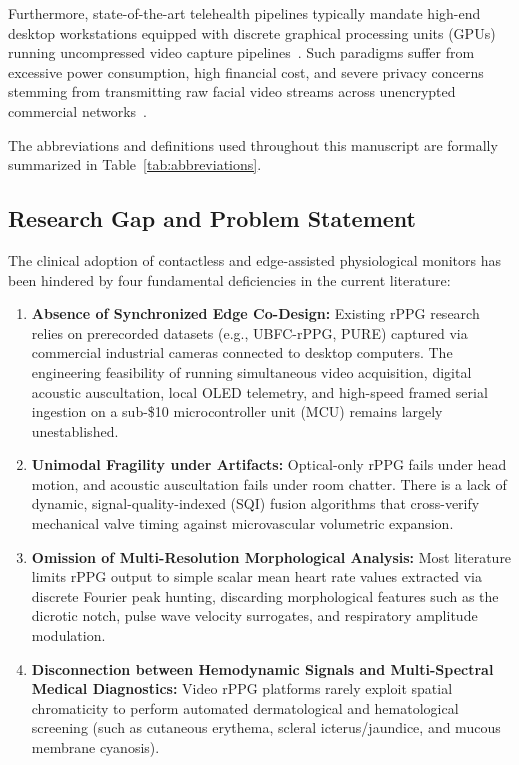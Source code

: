 \documentclass[journal]{IEEEtran}
\begin{document}
Furthermore, state-of-the-art telehealth pipelines typically mandate high-end desktop workstations equipped with discrete graphical processing units (GPUs) running uncompressed video capture pipelines~\cite{ref13}. Such paradigms suffer from excessive power consumption, high financial cost, and severe privacy concerns stemming from transmitting raw facial video streams across unencrypted commercial networks~\cite{ref14}. 

The abbreviations and definitions used throughout this manuscript are formally summarized in Table~\ref{tab:abbreviations}.

\subsection{Research Gap and Problem Statement}

The clinical adoption of contactless and edge-assisted physiological monitors has been hindered by four fundamental deficiencies in the current literature:
\begin{enumerate}
    \item \textbf{Absence of Synchronized Edge Co-Design:} Existing rPPG research relies on prerecorded datasets (e.g., UBFC-rPPG, PURE) captured via commercial industrial cameras connected to desktop computers. The engineering feasibility of running simultaneous video acquisition, digital acoustic auscultation, local OLED telemetry, and high-speed framed serial ingestion on a sub-\$10 microcontroller unit (MCU) remains largely unestablished.
    \item \textbf{Unimodal Fragility under Artifacts:} Optical-only rPPG fails under head motion, and acoustic auscultation fails under room chatter. There is a lack of dynamic, signal-quality-indexed (SQI) fusion algorithms that cross-verify mechanical valve timing against microvascular volumetric expansion.
    \item \textbf{Omission of Multi-Resolution Morphological Analysis:} Most literature limits rPPG output to simple scalar mean heart rate values extracted via discrete Fourier peak hunting, discarding morphological features such as the dicrotic notch, pulse wave velocity surrogates, and respiratory amplitude modulation.
    \item \textbf{Disconnection between Hemodynamic Signals and Multi-Spectral Medical Diagnostics:} Video rPPG platforms rarely exploit spatial chromaticity to perform automated dermatological and hematological screening (such as cutaneous erythema, scleral icterus/jaundice, and mucous membrane cyanosis).
\end{enumerate}
\end{document}
